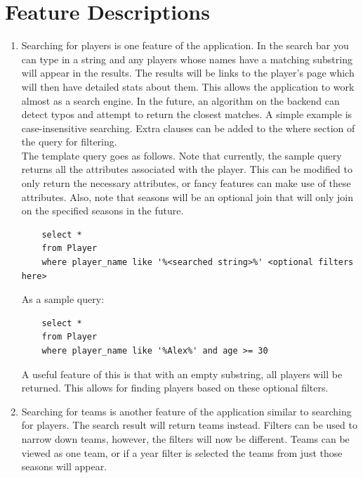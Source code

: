 \documentclass[11pt]{article}
\begin{document}
\section{Feature Descriptions}


\begin{enumerate}

\item Searching for players is one feature of the application. In the search bar you can type in a string and any players whose names have a matching substring will appear in the results. The results will be links to the player's page which will then have detailed stats about them. This allows the application to work almost as a search engine. In the future, an algorithm on the backend can detect typos and attempt to return the closest matches. A simple example is case-insensitive searching. Extra clauses can be added to the where section of the query for filtering. \\

The template query goes as follows. Note that currently, the sample query returns all the attributes associated with the player. This can be modified to only return the necessary attributes, or fancy features can make use of these attributes. Also, note that seasons will be an optional join that will only join on the specified seasons in the future.

\begin{verbatim}
    select *
    from Player
    where player_name like '%<searched string>%' <optional filters here>
\end{verbatim}

As a sample query:
\begin{verbatim}
    select *
    from Player
    where player_name like '%Alex%' and age >= 30
\end{verbatim}

A useful feature of this is that with an empty substring, all players will be returned. This allows for finding players based on these optional filters. \\


\item Searching for teams is another feature of the application similar to searching for players. The search result will return teams instead. Filters can be used to narrow down teams, however, the filters will now be different. Teams can be viewed as one team, or if a year filter is selected the teams from just those seasons will appear. \\


\end{enumerate}
\end{document}
